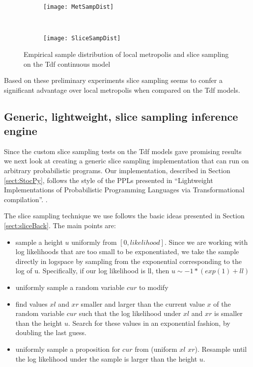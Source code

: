\begin{figure}[H]
    \centering
    \begin{subfigure}[t]{0.48\textwidth}
      \texttt{[image: MetSampDist]}
    \end{subfigure}
    ~
    \begin{subfigure}[t]{0.48\textwidth}
      \texttt{[image: SliceSampDist]}
    \end{subfigure}
    \caption{Empirical sample distribution of local metropolis and slice sampling on the Tdf continuous model}
    \label{fig:custSampDist}
\end{figure}

Based on these preliminary experiments slice sampling seems to confer a significant advantage over local metropolis when compared on the Tdf models.

\subsection{Generic, lightweight, slice sampling inference engine}

Since the custom slice sampling tests on the Tdf models gave promising results we next look at creating a generic slice sampling implementation that can run on arbitrary probabilistic programs. Our implementation, described in Section \ref{sect:StocPy}, follows the style of the PPLs presented in ``Lightweight Implementations of Probabilistic Programming Languages via Transformational compilation''. . 

The slice sampling technique we use follows the basic ideas presented in Section \ref{sect:sliceBack}. The main points are:
\begin{itemize}

\item
sample a height $u$ uniformly from $[0, likelihood]$. Since we are working with log likelihoods that are too small to be exponentiated, we take the sample directly in logspace by sampling from the exponential corresponding to the log of u. Specifically, if our log likelihood is ll, then $u \sim -1 * (exp(1) + ll)$

\item
uniformly sample a random variable $cur$ to modify

\item
find values $xl$ and $xr$ smaller and larger than the current value $x$ of the random variable $cur$ such that the log likelihood under $xl$ and $xr$ is smaller than the height $u$. Search for these values in an exponential fashion, by doubling the last guess.

\item
uniformly sample a proposition for $cur$ from (uniform $xl$ $xr$). Resample until the log likelihood under the sample is larger than the height $u$.

\end{itemize}

